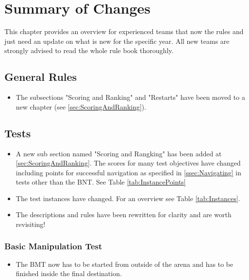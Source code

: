 
\chapter{Summary of Changes}

This chapter provides an overview for experienced teams that now the rules and just need an update on what is new for the specific year. All new teams are strongly advised to read the whole rule book thoroughly.

\section{General Rules}
\begin{itemize}
  \item The subsections "Scoring and Ranking" and "Restarts" have been moved to a new chapter (see \ref{sec:ScoringAndRanking}).
\end{itemize}

\section{Tests}
\begin{itemize}
  \item A new sub section named "Scoring and Rangking" has been added at \ref{sec:ScoringAndRanking}. The scores for many test objectives have changed including points for successful navigation as specified in \ref{ssec:Navigating} in tests other than the BNT. See Table \ref{tab:InstancePoints}
  \item The test instances have changed. For an overview see Table \ref{tab:Instances}.
  \item The descriptions and rules have been rewritten for clarity and are worth revisiting!
\end{itemize}

\subsection{Basic Manipulation Test} 
\begin{itemize}
  \item The BMT now has to be started from outside of the arena and has to be finished inside the final destination.
\end{itemize}


